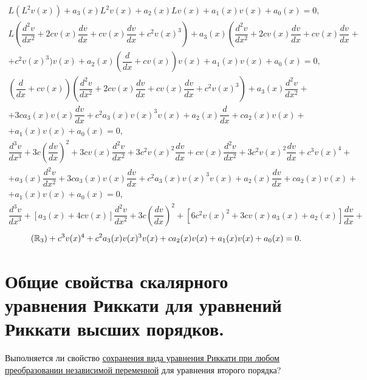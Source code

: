 \begin{multline*}
    L \left( L^2 v(x) \right)+ a_3(x) L^2 v(x) + a_2(x) L v(x) + a_1(x) v(x) + a_0(x) = 0, \\
    L \left( \dfrac{d^2v}{dx^2} + 2c v(x) \dfrac{dv}{dx} + c v(x) \dfrac{dv}{dx} + c^2 v(x)^3 \right)+ a_3(x) \left( \dfrac{d^2v}{dx^2} + 2c v(x) \dfrac{dv}{dx} + c v(x) \dfrac{dv}{dx} \right. + \\ + c^2 v(x)^3 \biggr) v(x) + a_2(x) \left(\dfrac{d}{dx} + c v(x)\right) v(x) + a_1(x) v(x) + a_0(x) = 0, \\
    \left(\dfrac{d}{dx} + c v(x)\right) \left( \dfrac{d^2v}{dx^2} + 2c v(x) \dfrac{dv}{dx} + c v(x) \dfrac{dv}{dx} + c^2 v(x)^3 \right)+ a_3(x)  \dfrac{d^2v}{dx^2} + \\ + 3c a_3(x) v(x) \dfrac{dv}{dx} + c^2 a_3(x) v(x)^3 v(x) + a_2(x) \dfrac{d}{dx} + c a_2(x) v(x) + \\ + a_1(x) v(x) + a_0(x) = 0, \\
    \dfrac{d^3v}{dx^3} + 3c \left( \dfrac{dv}{dx} \right)^2 + 3c v(x) \dfrac{d^2v}{dx^2} + 3 c^2 v(x)^2 \dfrac{dv}{dx} + c v(x) \dfrac{d^2v}{dx^2} + 3 c^2 v(x)^2 \dfrac{dv}{dx} + c^3 v(x)^4 + \\ + a_3(x) \dfrac{d^2v}{dx^2} + 3c a_3(x) v(x) \dfrac{dv}{dx} + c^2 a_3(x) v(x)^3 v(x) + a_2(x) \dfrac{dv}{dx} + c a_2(x) v(x) + \\ + a_1(x) v(x) + a_0(x) = 0, \\
    \dfrac{d^3v}{dx^3} + \left[ a_3(x) + 4c v(x) \right] \dfrac{d^2v}{dx^2} + 3c \left( \dfrac{dv}{dx} \right)^2 + \left[ 6 c^2 v(x)^2 + 3c v(x) a_3(x) + a_2(x) \right] \dfrac{dv}{dx} +
\end{multline*}
\begin{equation}
    \tag{$\mathbb{R}_3$}
    + c^3 v(x)^4 + c^2 a_3(x) v(x)^3 v(x) + c a_2(x) v(x) + a_1(x) v(x) + a_0(x) = 0.
\end{equation}

\section{Общие свойства скалярного уравнения Риккати для уравнений Риккати высших порядков.}
Выполняется ли свойство \hyperlink{first_prop}{сохранения вида уравнения Риккати при любом преобразовании независимой переменной} для уравнения второго порядка?

